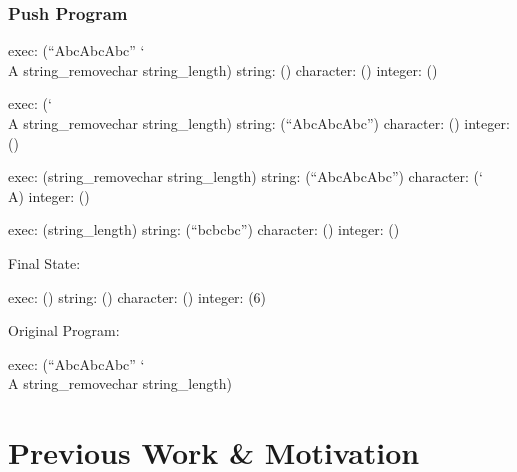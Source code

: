 \documentclass{beamer}
\begin{document}
\begin{frame}[fragile]
\frametitle{Push Program}
\begin{overprint}
\begin{semiverbatim}
exec: (``AbcAbcAbc'' \char`\\A string\_removechar
        string\_length)
string: ()
character: ()
integer: ()
\end{semiverbatim}
\begin{semiverbatim}
exec: (\char`\\A string\_removechar string\_length)
string: (``AbcAbcAbc'')
character: ()
integer: ()
\end{semiverbatim}
\begin{semiverbatim}
exec: (string\_removechar string\_length)
string: (``AbcAbcAbc'')
character: (\char`\\A)
integer: ()
\end{semiverbatim}
\begin{semiverbatim}
exec: (string\_length)
string: (``bcbcbc'')
character: ()
integer: ()

\end{semiverbatim}
Final State:
\begin{semiverbatim}
exec: ()
string: ()
character: ()
integer: (6)
\end{semiverbatim}
Original Program:
\begin{semiverbatim}
exec: (``AbcAbcAbc'' \char`\\A string\_removechar
        string\_length)
\end{semiverbatim}
\end{overprint}
\end{frame}

   \section{Previous Work \& Motivation}
\end{document}

